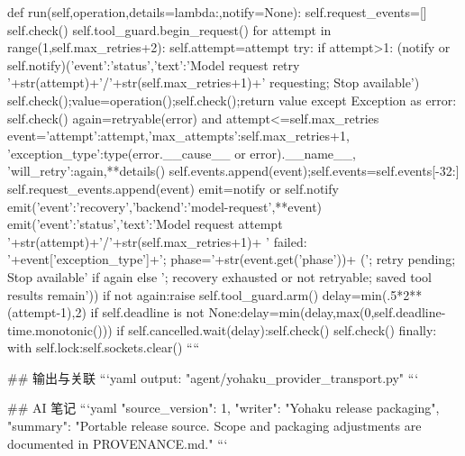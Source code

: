    def run(self,operation,details=lambda:{},notify=None):
        self.request_events=[]
        self.check()
        self.tool_guard.begin_request()
        for attempt in range(1,self.max_retries+2):
            self.attempt=attempt
            try:
                if attempt>1:
                    (notify or self.notify)({'event':'status','text':'Model request retry '+str(attempt)+'/'+str(self.max_retries+1)+' requesting; Stop available'})
                self.check();value=operation();self.check();return value
            except Exception as error:
                self.check()
                again=retryable(error) and attempt<=self.max_retries
                event={'attempt':attempt,'max_attempts':self.max_retries+1,
                    'exception_type':type(error.__cause__ or error).__name__,
                    'will_retry':again,**details()}
                self.events.append(event);self.events=self.events[-32:]
                self.request_events.append(event)
                emit=notify or self.notify
                emit({'event':'recovery','backend':'model-request',**event})
                emit({'event':'status','text':'Model request attempt '+str(attempt)+'/'+str(self.max_retries+1)+
                    ' failed: '+event['exception_type']+'; phase='+str(event.get('phase'))+
                    ('; retry pending; Stop available' if again else '; recovery exhausted or not retryable; saved tool results remain')})
                if not again:raise
                self.tool_guard.arm()
                delay=min(.5*2**(attempt-1),2)
                if self.deadline is not None:delay=min(delay,max(0,self.deadline-time.monotonic()))
                if self.cancelled.wait(delay):self.check()
                self.check()
            finally:
                with self.lock:self.sockets.clear()
````

## 输出与关联
```yaml
output: "agent/yohaku_provider_transport.py"
```

## AI 笔记
```yaml
{"source_version": 1, "writer": "Yohaku release packaging", "summary": "Portable release source. Scope and packaging adjustments are documented in PROVENANCE.md."}
```
